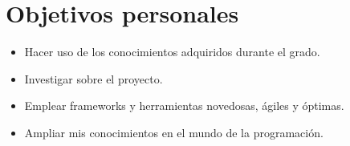 \section{Objetivos personales}
\begin{itemize}
\item Hacer uso de los conocimientos adquiridos durante el grado.
\item Investigar sobre el proyecto.
\item Emplear frameworks y herramientas novedosas, ágiles y óptimas.
\item Ampliar mis conocimientos en el mundo de la programación.
\end{itemize}